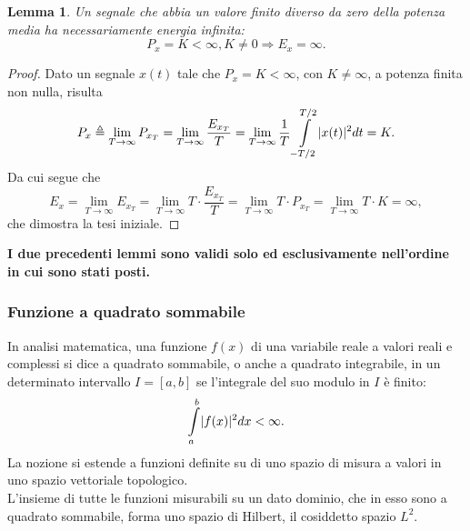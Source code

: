 \documentclass[12pt,oneside,openany]{memoir}
\numberwithin{equation}{subsection}
\newtheorem{lemma}[theorem]{Lemma}
\DeclarePairedDelimiter{\abs}{\lvert}{\rvert}
\begin{document}
\begin{lemma}
Un segnale che abbia un valore finito diverso da zero della potenza media ha necessariamente energia infinita:
\begin{equation}
	P_x = K < \infty, K \neq 0 \Longrightarrow E_x = \infty.
\end{equation}
\end{lemma}
\begin{proof}
Dato un segnale $x(t)$ tale che $P_x = K < \infty$, con $K \neq \infty$, a potenza finita non nulla, risulta
\begin{equation}
	P_x \triangleq \lim_{T \rightarrow \infty} P_{x_T} = \lim_{T \rightarrow \infty} \frac{E_{x_T}}{T} = \lim_{T \rightarrow \infty} \frac{1}{T} \int\displaylimits_{-T/2}^{T/2} \abs{x(t)}^2 dt = K.
\end{equation}
Da cui segue che
\begin{equation}
	E_x = \lim_{T \rightarrow \infty} E_{x_T} = \lim_{T \rightarrow \infty} T \cdot \frac{E_{x_T}}{T} = \lim_{T \rightarrow \infty} T \cdot P_{x_T} = \lim_{T \rightarrow \infty} T \cdot K = \infty,
\end{equation}
che dimostra la tesi iniziale.
\end{proof}

\noindent\textbf{I due precedenti lemmi sono validi solo ed esclusivamente nell'ordine in cui sono stati posti.}

\subsubsection{Funzione a quadrato sommabile}
In analisi matematica, una funzione $f(x)$ di una variabile reale a valori reali e complessi si dice a quadrato sommabile, o anche a quadrato integrabile, in un determinato intervallo $I = \left[a, b\right]$ se l'integrale del suo modulo in $I$ \`e finito:
\begin{equation}
	\int\displaylimits_{a}^{b} \abs{f(x)}^2 dx < \infty.
\end{equation}
La nozione si estende a funzioni definite su di uno spazio di misura a valori in uno spazio vettoriale topologico.\\
L'insieme di tutte le funzioni misurabili su un dato dominio, che in esso sono a quadrato sommabile, forma uno spazio di Hilbert, il cosiddetto spazio $L^2$.
\end{document}
